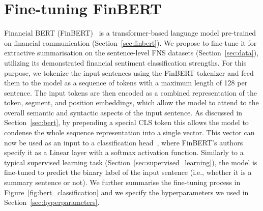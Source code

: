 \section{Fine-tuning FinBERT}\label{sec:finbert_finetuning}
Financial BERT (FinBERT)~\cite{yang2020finbert} is a transformer-based language model pre-trained on financial communication (Section~\ref{sec:finbert}).
We propose to fine-tune it for extractive summarisation on the sentence-level FNS datasets (Section~\ref{sec:data}), utilizing its demonstrated financial sentiment classification strengths.
For this purpose, we tokenize the input sentences using the FinBERT tokenizer and feed them to the model as a sequence of tokens with a maximum length of 128 per sentence.
The input tokens are then encoded as a combined representation of the token, segment, and position embeddings,
which allow the model to attend to the overall semantic and syntactic aspects of the input sentence.
As discussed in Section~\ref{sec:bert}, by prepending a special CLS token this allows the model to condense the whole sequence representation into a single vector.
This vector can now be used as an input to a classification head~\cite{jurafsky2000}, where FinBERT's authors specify it as a Linear layer with a softmax activation function.
Similarly to a typical supervised learning task (Section~\ref{sec:supervised_learning}), the model is fine-tuned to predict the binary label of the input sentence (i.e., whether it is a summary sentence or not).
We further summarise the fine-tuning process in Figure~\ref{fig:bert_classification} and we specify the hyperparameters we used in Section~\ref{sec:hyperparameters}.

